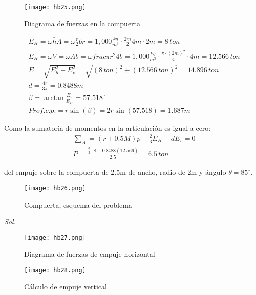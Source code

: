 \begin{figure}[h!]
\centering
  \texttt{[image: hb25.png]}
  \caption{Diagrama de fuerzas en la compuerta}
  \label{hb35}
\end{figure}
\begin{align*}
    &E_H=\bar{\omega}\bar{h}A=\bar{\omega}\frac{r}{2}br=1,000\frac{kg}{m^3}\cdot\frac{2m}{2}4m\cdot 2m=8\,ton\\
    &E_H=\bar{\omega}V=\bar{\omega}Ab=\bar{\omega}frac{\pi r^2}{4}b=1,000\frac{kg}{m^3}\cdot\frac{\pi\cdot (2m)^2}{4}\cdot 4m=12.566\,ton\\
    &E=\sqrt{E_h^2+E^2_v}=\sqrt{(8\,ton)^2+(12.566\,ton)^2}=14.896\,ton\\
    &d=\frac{4r}{3\pi}=0.8488m\\
    &\beta=\arctan{\frac{E_v}{E_H}}=57.518^{\circ}\\
    &Prof.c.p.=r\sin{(\beta)}=2r\sin{(57.518)}=1.687m
\end{align*}

Como la sumatoria de momentos en la articulación es igual a cero: 
\begin{align*}
    &\sum_A =(r+0.5M)p-\frac{2}{3}E_H-dE_v=0\\
    &P=\frac{\frac{2}{3}\cdot 8+0.8488(12.566)}{2.5}=6.5\, ton
\end{align*}

\begin{problem}
    del empuje sobre la compuerta de 2.5m de ancho, radio de 2m y ángulo $\theta=85^{\circ}$.
\end{problem}
\begin{figure}[h!]
\centering
  \texttt{[image: hb26.png]}
  \caption{Compuerta, esquema del problema}
  \label{hb26}
\end{figure}

\textit{ Sol. }

\begin{figure}[h!]
\centering
  \texttt{[image: hb27.png]}
  \caption{Diagrama de fuerzas de empuje horizontal}
  \label{hb27}
\end{figure}

\begin{figure}[h!]
\centering
  \texttt{[image: hb28.png]}
  \caption{Cálculo de empuje vertical}
  \label{hb28}
\end{figure}

